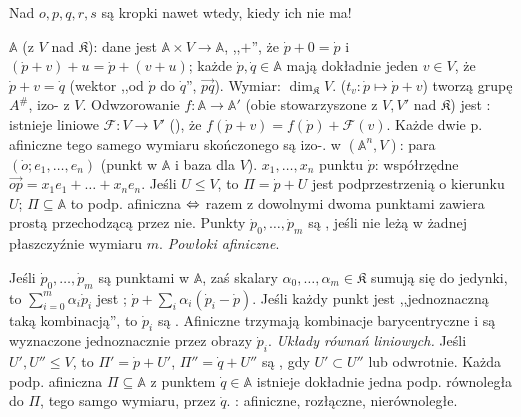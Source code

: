 Nad $o, p, q, r, s$ są kropki nawet wtedy, kiedy ich nie ma!

  $\mathbb A$ (z $V$ nad $\mathfrak K$): dane jest $\mathbb A \times V \to \mathbb A$, ,,$+$'', że $\dot p + 0 = \dot p$ i $(\dot p + v)+u = \dot p + (v+u)$; każde $\dot p, \dot q \in \mathbb A$ mają dokładnie jeden $v \in V$, że $\dot p + v = \dot q$ (wektor ,,od $\dot p$ do $\dot q$'', $\overrightarrow{pq}$).
Wymiar: $\dim_{\mathfrak K} V$.
 ($t_v \colon \dot p \mapsto \dot p+v$) tworzą grupę $A^{\#}$, izo- z $V$.
Odwzorowanie $f \colon \mathbb A \to \mathbb A'$ (obie stowarzyszone z $V, V'$ nad $\mathfrak K$) jest : istnieje liniowe $\mathcal F \colon V \to V'$ (), że $f(\dot p + v) = f(\dot p) + \mathcal F(v)$.
Każde dwie p. afiniczne tego samego wymiaru skończonego są izo-.
 w $(\mathbb A^n, V)$: para $(\dot o; e_1, \dots, e_n)$ (punkt w $\mathbb A$ i baza dla $V$).
 $x_1, \dots, x_n$ punktu $\dot p$: współrzędne $\overrightarrow{op} = x_1 e_1 + \dots + x_n e_n$.
Jeśli $U \le V$, to $\Pi = \dot p + U$ jest podprzestrzenią o kierunku $U$; $\Pi \subseteq \mathbb A$ to podp. afiniczna $\Leftrightarrow$ razem z dowolnymi dwoma punktami zawiera prostą przechodzącą przez nie.
Punkty $\dot p_0, \dots, \dot p_m$ są , jeśli nie leżą w żadnej płaszczyźnie wymiaru $m$.
\emph{Powłoki afiniczne}.

Jeśli $\dot p_0, \dots, \dot p_m$ są punktami w $\mathbb A$, zaś skalary $\alpha_0, \dots, \alpha_m \in \mathfrak K$ sumują się do jedynki, to $\sum_{i=0}^m \alpha_i \dot p_i$ jest ; $\dot p + \sum_i \alpha_i (\dot p_i -\dot p)$.
Jeśli każdy punkt jest ,,jednoznaczną taką kombinacją'', to $\dot p_i$ są .
Afiniczne trzymają kombinacje barycentryczne i są wyznaczone jednoznacznie przez obrazy $\dot p_i$.
\emph{Układy równań liniowych.} %
Jeśli $U', U''\le V$, to $\Pi' = \dot p + U'$, $\Pi'' = \dot q + U''$ są , gdy $U' \subset U''$ lub odwrotnie.
Każda podp. afiniczna $\Pi \subseteq \mathbb A$ z punktem $\dot q \in \mathbb A$ istnieje dokładnie jedna podp. równoległa do $\Pi$, tego samgo wymiaru, przez $\dot q$.
: afiniczne, rozłączne, nierównoległe.

